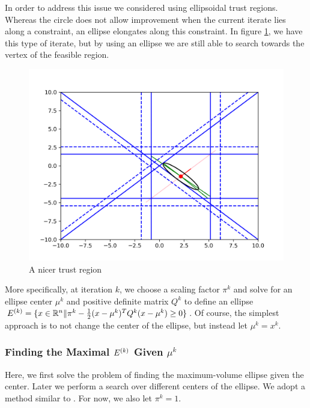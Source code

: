 In order to address this issue we considered using ellipsoidal trust regions.
Whereas the circle does not allow improvement when the current iterate lies along a constraint, an ellipse elongates along this constraint.
In figure \cref{ellipse_adv}, we have this type of iterate, but by using an ellipse we are still able to search towards the vertex of the feasible region.
\begin{figure}[h]
    \centering
    \includegraphics[scale=0.4]{images/advantage_of_ellipse_2.png}
    \caption{A nicer trust region}
    \label{ellipse_adv}
\end{figure}


More specifically, at iteration $k$, we choose a scaling factor $\pi^k$ and solve for an ellipse center $\mu^k$ and positive definite matrix $Q^k$ to define an ellipse
$ {E^{(k)}} = \{x \in \mathbb R^n \| \pi^k - \frac 1 2 (x - \mu^{k})^TQ^{k}(x - \mu^{k}) \ge 0 \}$.
Of course, the simplest approach is to not change the center of the ellipse, but instead let $\mu^k = x^k$.


\subsubsection{Finding the Maximal $ {E^{(k)}} $ Given $\mu^k$}

\label{ellipse_optimization}

Here, we first solve the problem of finding the maximum-volume ellipse given the center.
Later we perform a search over different centers of the ellipse.
We adopt a method similar to \cite{Khachiyan1993}.
For now, we also let $\pi^k = 1$.

